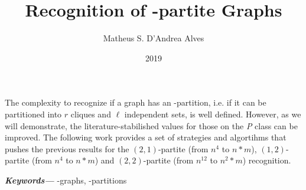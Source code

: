 
\providecommand{\keywords}[1]
{
  \small
  \textbf{\textit{Keywords---}} #1
}

\title{Recognition of \RL-partite Graphs}
\author{Matheus S. D'Andrea Alves}
\date{2019}
\imprimircapa

\begin{resumo}
  The complexity to recognize if a graph has an \RL-partition, i.e. if it can be partitioned into $r$ cliques and $\ell$ independent sets, is well defined\cite{brand-84}. However, as we will demonstrate, the literature-stabilished values for those on the \textit{P} class can be improved. The following work provides a set of strategies and algortihms that pushes the previous results for the $(2,1)$-partite (from $n^4$ to $n*m$), $(1,2)$-partite (from $n^4$ to $n*m$) and $(2,2)$-partite (from $n^{12}$ to $n^{2}*m$) recognition.

  \keywords{\RL-graphs, \RL-partitions}
\end{resumo}

\listoffigures*
\listoftables*
\tableofcontents
